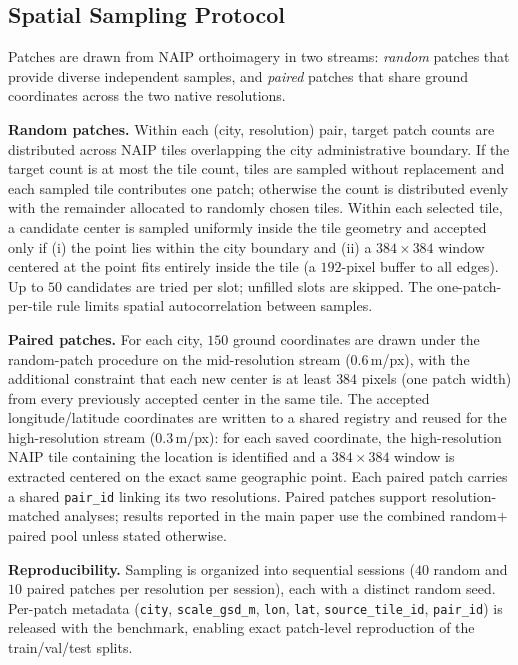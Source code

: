 \subsection{Spatial Sampling Protocol}
\label{app:sampling}

Patches are drawn from NAIP orthoimagery in two streams: \emph{random}
patches that provide diverse independent samples, and \emph{paired}
patches that share ground coordinates across the two native resolutions.

\textbf{Random patches.}
Within each (city, resolution) pair, target patch counts are distributed
across NAIP tiles overlapping the city administrative boundary. If the
target count is at most the tile count, tiles are sampled without
replacement and each sampled tile contributes one patch; otherwise the
count is distributed evenly with the remainder allocated to randomly
chosen tiles. Within each selected tile, a candidate center is sampled
uniformly inside the tile geometry and accepted only if (i) the point
lies within the city boundary and (ii) a $384{\times}384$ window centered
at the point fits entirely inside the tile (a $192$-pixel buffer to all
edges). Up to $50$ candidates are tried per slot; unfilled slots are
skipped. The one-patch-per-tile rule limits spatial autocorrelation
between samples.

\textbf{Paired patches.}
For each city, $150$ ground coordinates are drawn under the random-patch
procedure on the mid-resolution stream ($0.6$\,m/px), with the additional
constraint that each new center is at least $384$ pixels (one patch
width) from every previously accepted center in the same tile. The
accepted longitude/latitude coordinates are written to a shared registry
and reused for the high-resolution stream ($0.3$\,m/px): for each saved
coordinate, the high-resolution NAIP tile containing the location is
identified and a $384{\times}384$ window is extracted centered on the
exact same geographic point. Each paired patch carries a shared
\texttt{pair\_id} linking its two resolutions. Paired patches support
resolution-matched analyses; results reported in the main paper use the
combined random$+$paired pool unless stated otherwise.

\textbf{Reproducibility.}
Sampling is organized into sequential sessions ($40$ random and $10$
paired patches per resolution per session), each with a distinct random
seed. Per-patch metadata (\texttt{city}, \texttt{scale\_gsd\_m},
\texttt{lon}, \texttt{lat}, \texttt{source\_tile\_id}, \texttt{pair\_id})
is released with the benchmark, enabling exact patch-level reproduction
of the train/val/test splits.